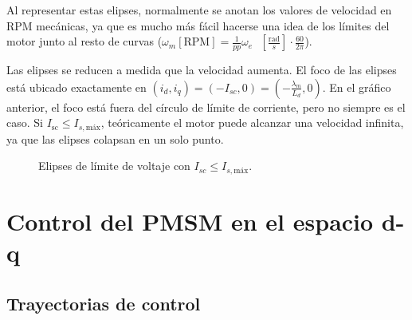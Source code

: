 Al representar estas elipses, normalmente se anotan los valores de velocidad en RPM mecánicas, ya que es mucho más fácil hacerse una idea de los límites del motor junto al resto de curvas (\(\omega_m [\text{RPM}] = \frac{1}{pp} \omega_e \text{ }\left[\frac{\text{rad}}{s}\right] \cdot \frac{60}{2\pi}\)).

Las elipses se reducen a medida que la velocidad aumenta. El foco de las elipses está ubicado exactamente en \((i_d, i_q)=(-I_{sc}, 0) = \left(-\frac{\lambda_m}{L_d},0\right)\). En el gráfico anterior, el foco está fuera del círculo de límite de corriente, pero no siempre es el caso. Si \(I_{\text{sc}} \leq I_{s,\text{máx}}\), teóricamente el motor puede alcanzar una velocidad infinita, ya que las elipses colapsan en un solo punto. 



\begin{figure}[H]
  \centering
  \caption{Elipses de límite de voltaje con $I_{sc} \leq I_{s,\text{máx}}$.}
\end{figure}





\section{Control del PMSM en el espacio d-q}
\subsection{Trayectorias de control}

